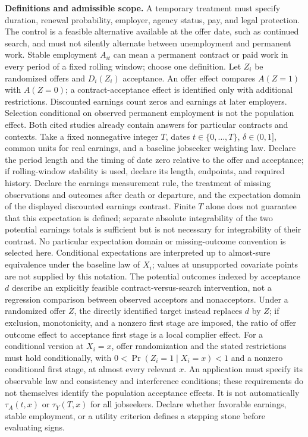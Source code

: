 \documentclass[11pt,a4paper]{article}
\begin{document}
\textbf{Definitions and admissible scope.} A temporary treatment must specify duration, renewal probability, employer, agency status, pay, and legal protection. The control is a feasible alternative available at the offer date, such as continued search, and must not silently alternate between unemployment and permanent work. Stable employment \(A_{it}\) can mean a permanent contract or paid work in every period of a fixed rolling window; choose one definition. Let \(Z_i\) be randomized offers and \(D_i(Z_i)\) acceptance. An offer effect compares \(A(Z=1)\) with \(A(Z=0)\); a contract-acceptance effect is identified only with additional restrictions. Discounted earnings count zeros and earnings at later employers. Selection conditional on observed permanent employment is not the population effect. Both cited studies already contain answers for particular contracts and contexts. Take a fixed nonnegative integer \(T\), dates \(t\in\{0,\ldots,T\}\), \(\delta\in(0,1]\), common units for real earnings, and a baseline jobseeker weighting law. Declare the period length and the timing of date zero relative to the offer and acceptance; if rolling-window stability is used, declare its length, endpoints, and required history. Declare the earnings measurement rule, the treatment of missing observations and outcomes after death or departure, and the expectation domain of the displayed discounted earnings contrast. Finite \(T\) alone does not guarantee that this expectation is defined; separate absolute integrability of the two potential earnings totals is sufficient but is not necessary for integrability of their contrast. No particular expectation domain or missing-outcome convention is selected here. Conditional expectations are interpreted up to almost-sure equivalence under the baseline law of \(X_i\); values at unsupported covariate points are not supplied by this notation. The potential outcomes indexed by acceptance \(d\) describe an explicitly feasible contract-versus-search intervention, not a regression comparison between observed acceptors and nonacceptors. Under a randomized offer \(Z\), the directly identified target instead replaces \(d\) by \(Z\); if exclusion, monotonicity, and a nonzero first stage are imposed, the ratio of offer outcome effect to acceptance first stage is a local complier effect. For a conditional version at \(X_i=x\), offer randomization and the stated restrictions must hold conditionally, with \(0<\Pr(Z_i=1\mid X_i=x)<1\) and a nonzero conditional first stage, at almost every relevant \(x\). An application must specify its observable law and consistency and interference conditions; these requirements do not themselves identify the population acceptance effects. It is not automatically \(\tau_A(t,x)\) or \(\tau_Y(T,x)\) for all jobseekers. Declare whether favorable earnings, stable employment, or a utility criterion defines a stepping stone before evaluating signs.
\end{document}

